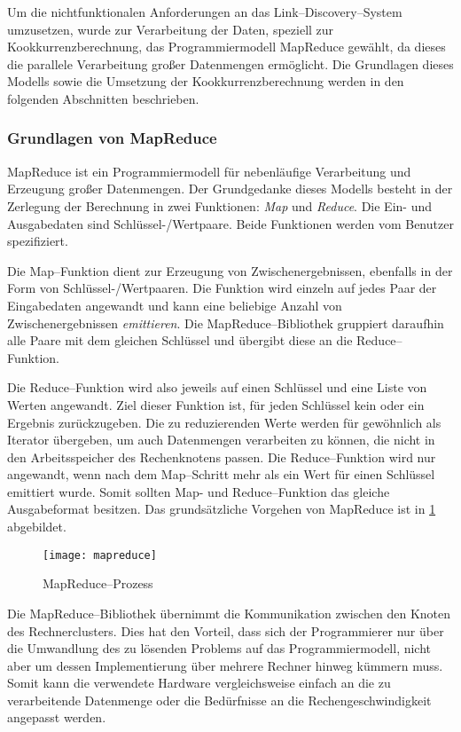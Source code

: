 Um die nichtfunktionalen Anforderungen an das Link--Discovery--System umzusetzen, wurde zur Verarbeitung der Daten, speziell zur Kookkurrenzberechnung, das Programmiermodell MapReduce gewählt, da dieses die parallele Verarbeitung großer Datenmengen ermöglicht. Die Grundlagen dieses Modells sowie die Umsetzung der Kookkurrenzberechnung werden in den folgenden Abschnitten beschrieben.

\subsubsection{Grundlagen von MapReduce}
\label{mapreduce_basic}

MapReduce \cite{dg2004} ist ein Programmiermodell für nebenläufige Verarbeitung und Erzeugung großer Datenmengen. Der Grundgedanke dieses Modells besteht in der Zerlegung der Berechnung in zwei Funktionen: \emph{Map} und \emph{Reduce}. Die Ein- und Ausgabedaten sind Schlüssel-/Wertpaare. Beide Funktionen werden vom Benutzer spezifiziert.

Die Map--Funktion dient zur Erzeugung von Zwischenergebnissen, ebenfalls in der Form von Schlüssel-/Wertpaaren. Die Funktion wird einzeln auf jedes Paar der Eingabedaten angewandt und kann eine beliebige Anzahl von Zwischenergebnissen \emph{emittieren}. Die MapReduce--Bibliothek gruppiert daraufhin alle Paare mit dem gleichen Schlüssel und übergibt diese an die Reduce--Funktion.

Die Reduce--Funktion wird also jeweils auf einen Schlüssel und eine Liste von Werten angewandt. Ziel dieser Funktion ist, für jeden Schlüssel kein oder ein Ergebnis zurückzugeben. Die zu reduzierenden Werte werden für gewöhnlich als Iterator übergeben, um auch Datenmengen verarbeiten zu können, die nicht in den Arbeitsspeicher des Rechenknotens passen. Die Reduce--Funktion wird nur angewandt, wenn nach dem Map--Schritt mehr als ein Wert für einen Schlüssel emittiert wurde. Somit sollten Map- und Reduce--Funktion das gleiche Ausgabeformat besitzen. Das grundsätzliche Vorgehen von MapReduce ist in \cref{fig:mapreduce} abgebildet.

\begin{figure}
\centering
\texttt{[image: mapreduce]}
\caption{MapReduce--Prozess}
\label{fig:mapreduce}
\end{figure}

Die MapReduce--Bibliothek übernimmt die Kommunikation zwischen den Knoten des Rechnerclusters. Dies hat den Vorteil, dass sich der Programmierer nur über die Umwandlung des zu lösenden Problems auf das Programmiermodell, nicht aber um dessen Implementierung über mehrere Rechner hinweg kümmern muss. Somit kann die verwendete Hardware vergleichsweise einfach an die zu verarbeitende Datenmenge oder die Bedürfnisse an die Rechengeschwindigkeit angepasst werden.


